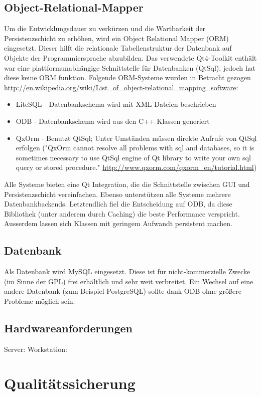 \documentclass[a4paper,10pt]{article}
\begin{document}
\subsection{Object-Relational-Mapper}
Um die Entwicklungsdauer zu verkürzen und die Wartbarkeit der Persistenzschicht zu erhöhen, wird ein Object Relational Mapper (ORM) eingesetzt. 
Dieser hilft die relationale Tabellenstruktur der Datenbank auf Objekte der Programmiersprache abzubilden.
Das verwendete Qt4-Toolkit enthält war eine plattformunabhängige Schnittstelle für Datenbanken (QtSql), jedoch hat diese keine ORM funktion.
Folgende ORM-Systeme wurden in Betracht gezogen \newline\url{http://en.wikipedia.org/wiki/List_of_object-relational_mapping_software}:
\begin{itemize}
	\item LiteSQL - Datenbankschema wird mit XML Dateien beschrieben
	\item ODB - Datenbankschema wird aus den C++ Klassen generiert
	\item QxOrm - Benutzt QtSql; Unter Umständen müssen direkte Aufrufe von QtSql erfolgen ("QxOrm cannot resolve all problems with sql and databases, so it is sometimes necessary to use QtSql engine of Qt library to write your own sql query or stored procedure." \url{http://www.qxorm.com/qxorm_en/tutorial.html})
\end{itemize}
Alle Systeme bieten eine Qt Integration, die die Schnittstelle zwischen GUI und Persistenzschicht vereinfachen. Ebenso unterstützen alle Systeme mehrere Datenbankbackends.
Letztendlich fiel die Entscheidung auf ODB, da diese Bibliothek (unter anderem durch Caching) die beste Performance verspricht. Ausserdem lassen sich Klassen mit geringem Aufwandt persistent machen.

\subsection{Datenbank}
Als Datenbank wird MySQL eingesetzt. Diese ist für nicht-kommerzielle Zwecke (im Sinne der GPL) frei erhältlich und sehr weit verbreitet. 
Ein Wechsel auf eine andere Datenbank (zum Beispiel PostgreSQL) sollte dank ODB ohne größere Probleme möglich sein.
\subsection{Hardwareanforderungen}
Server:
Workstation:

\section{Qualitätssicherung}
\end{document}
